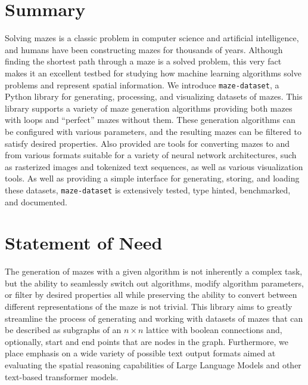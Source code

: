 \documentclass[10pt,a4paper,onecolumn]{article}
\let\origfigure\figure
\let\endorigfigure\endfigure
\renewenvironment{figure}[1][2] {
    \expandafter\origfigure\expandafter[H]
} {
    \endorigfigure
}
\begin{document}
\hypertarget{summary}{%
\section{Summary}\label{summary}}

Solving mazes is a classic problem in computer science and artificial
intelligence, and humans have been constructing mazes for thousands of
years. Although finding the shortest path through a maze is a solved
problem, this very fact makes it an excellent testbed for studying how
machine learning algorithms solve problems and represent spatial
information. We introduce \texttt{maze-dataset}, a Python library for
generating, processing, and visualizing datasets of mazes. This library
supports a variety of maze generation algorithms providing both mazes
with loops and ``perfect'' mazes without them. These generation
algorithms can be configured with various parameters, and the resulting
mazes can be filtered to satisfy desired properties. Also provided are
tools for converting mazes to and from various formats suitable for a
variety of neural network architectures, such as rasterized images and
tokenized text sequences, as well as various visualization tools. As
well as providing a simple interface for generating, storing, and
loading these datasets, \texttt{maze-dataset} is extensively tested,
type hinted, benchmarked, and documented.

\begin{figure} 
  \begin{minipage}{5in}
     
  \end{minipage}
  \caption{Usage of maze-dataset. We create a `MazeDataset` from a `MazeDatasetConfig`. This contains `SolvedMaze` objects which can be converted to and from a variety of formats. Code in the image contains clickable links to \href{https://understanding-search.github.io/maze-dataset/maze_dataset.html}{documentation}. A variety of generated examples can be viewed \href{https://understanding-search.github.io/maze-dataset/examples/maze_examples.html}{here}.}
  \label{fig:diagram}
\end{figure}

\hypertarget{statement-of-need}{%
\section{Statement of Need}\label{statement-of-need}}

The generation of mazes with a given algorithm is not inherently a
complex task, but the ability to seamlessly switch out algorithms,
modify algorithm parameters, or filter by desired properties all while
preserving the ability to convert between different representations of
the maze is not trivial. This library aims to greatly streamline the
process of generating and working with datasets of mazes that can be
described as subgraphs of an \(n \times n\) lattice with boolean
connections and, optionally, start and end points that are nodes in the
graph. Furthermore, we place emphasis on a wide variety of possible text
output formats aimed at evaluating the spatial reasoning capabilities of
Large Language Models and other text-based transformer models.
\end{document}
